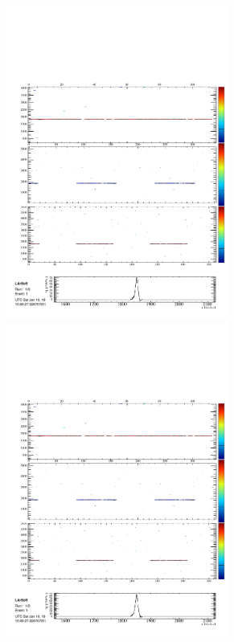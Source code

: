 \begin{figure}
\begin{subfigure}[t]{\linewidth}
\begin{minipage}{0.48\textwidth}
      \includegraphics[width=0.8\textwidth]{SimulatedMuonZ1.pdf}
      \includegraphics[width=0.8\textwidth]{SimulatedMuonZ2.pdf}

\end{minipage}
\end{subfigure}
\end{figure}
